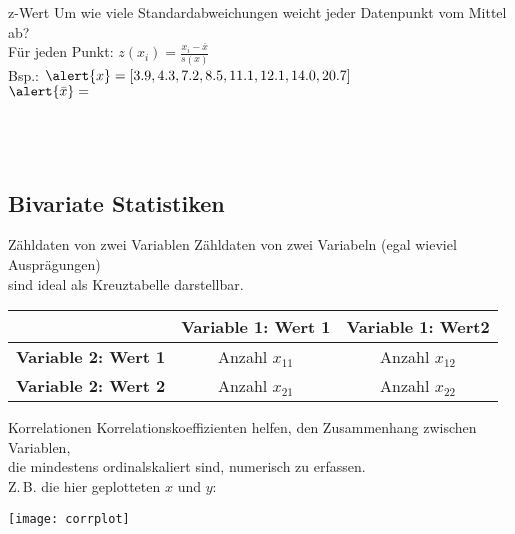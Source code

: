 \begin{frame}
  {z-Wert}
  Um wie viele Standardabweichungen weicht jeder Datenpunkt vom Mittel ab?\\
  Für jeden Punkt: \alert{$z(x_i)=\frac{x_i-\bar{x}}{s(x)}$}\\[3ex]

  Bsp.: $\alert{x}=[3.9, 4.3, 7.2, 8.5, 11.1, 12.1, 14.0, 20.7]$\\[1ex]
  $\alert{\bar{x}}=$\\[1ex]
  \\[1ex]
  \\[1ex]
  \\[1ex]
\end{frame}

\subsection{Bivariate Statistiken}

\begin{frame}
  {Zähldaten von zwei Variablen}
  Zähldaten von zwei Variabeln (egal wieviel Ausprägungen)\\
  sind ideal als \alert{Kreuztabelle} darstellbar.\\
  \vspace{1cm}

  \begin{center}
    \begin{tabular}{|c|c|c|}
      \cline{2-3}
      \multicolumn{1}{c|}{} & \textbf{Variable 1: Wert 1} & \textbf{Variable 1: Wert2} \\
      \hline
      \textbf{Variable 2: Wert 1} & Anzahl $x_{11}$ & Anzahl $x_{12}$ \\
      \textbf{Variable 2: Wert 2} & Anzahl $x_{21}$ & Anzahl $x_{22}$ \\
      \hline
    \end{tabular}
  \end{center}
\end{frame}

\begin{frame}
  {Korrelationen}
  Korrelationskoeffizienten helfen, den Zusammenhang zwischen Variablen,\\
  die mindestens ordinalskaliert sind, numerisch zu erfassen.\\
  Z.\,B. die hier geplotteten $x$ und $y$:
  \vspace{-0.5cm}
  \begin{center}
    \texttt{[image: corrplot]}
  \end{center}
\end{frame}


